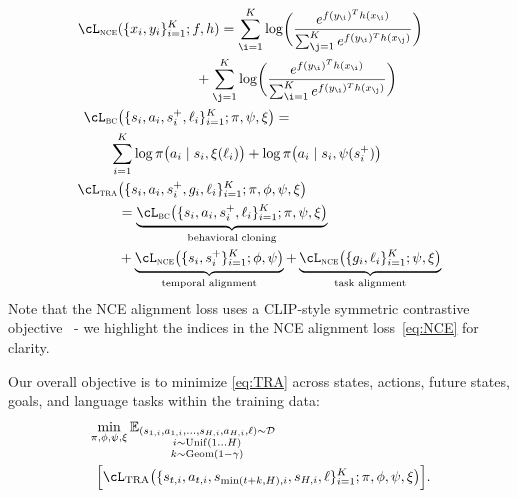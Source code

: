 \begin{align}
    \cL_{\textsc{nce}} \label{eq:NCE}
    &(\{x_{i}, y_{i}\}_{i=1}^{K};f,h) =
        \sum_{{\i=1}}^{K} \log \biggl( {\frac{e^{f(y_{\i})^{T}h(x_{\i})}}{\sum_{{\j=1}}^{K}
        e^{f(y_{\i})^{T}h(x_{\j})}}} \biggr) \nonumber\\*
      &\mspace{100mu} +
        \sum_{{\j=1}}^{K} \log \biggl( {\frac{e^{f(y_{\i})^{T}h(x_{\i})}}{\sum_{{\i=1}}^{K}
        e^{f(y_{\i})^{T}h(x_{\j})}}} \biggr) \\
    \cL_{\textsc{bc}} \label{eq:BC}
    &\bigl(\{s_{i},a_{i},s^{+}_{i},\ell_{i}\}_{i=1}^{K};\pi,\psi,\xi\bigr) = \nonumber\\*
      &\mspace{-10mu} \sum_{{i=1}}^{K} \log
        \pi\bigl(a_{i} \mid s_{i},\xi(\ell_{i})\bigr) + \log \pi\bigl(a_{i} \mid
        s_{i},\psi(s^{+}_{i})\bigr) \\
    \cL_{\textsc{tra}}
    &\label{eq:TRA} \bigl( \{s_{i},a_{i},s_{i}^{+},g_{i},\ell_{i}\}_{i=1}^{K}; \pi,\phi,\psi,\xi\bigr)
        \\
    &= \underbrace{\cL_{\textsc{bc}}\bigl(\{s_{i},a_{i},s_{i}^{+},\ell_{i}\}_{i=1}^{K};\pi,\psi,\xi\bigr)}_{\text{behavioral
    cloning}} \nonumber\\*
    &+
        \underbrace{\cL_{\textsc{nce}}\bigl(\{s_{i},s_{i}^{+}\}_{i=1}^{K};\phi,\psi\bigr)}_{\text{temporal alignment}}
        + \underbrace{\cL_{\textsc{nce}}\bigl(\{g_{i},\ell_{i}\}_{i=1}^{K};\psi,\xi\bigr)}_{\text{task alignment}} \nonumber
\end{align}Note that the NCE alignment loss uses a CLIP-style symmetric contrastive objective~\citep{radford2021learning,eysenbach2024inference} \-- we highlight the indices in the NCE alignment loss~\eqref{eq:NCE} for clarity.

Our overall objective is to minimize \cref{eq:TRA} across states, actions, future states, goals, and language tasks within the training data:
\begin{align}
    &\min_{\pi,\phi,\psi,\xi} \mathbb{E}_{\substack{(s_{1,i},a_{1,i},\ldots,s_{H,i},a_{H,i},\ell) \sim \mathcal{D} \\
    i\sim\operatorname{Unif}(1\ldots H) \\
    k\sim\operatorname{Geom}(1-\gamma)}} \\*
    &\mspace{10mu}
    \Bigl[\cL_{\text{TRA}}\bigl(\{s_{t,i},a_{t,i},s_{\min(t+k,H),i},s_{H,i},\ell\}_{i=1}^{K};\pi,\phi,\psi,\xi\bigr)\Bigr].
    \label{eq:overall_objective}
\end{align}

